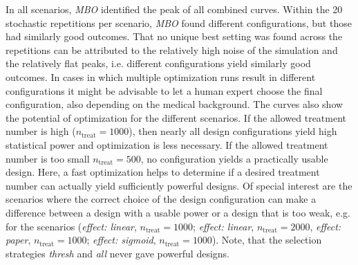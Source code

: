 \documentclass[bimj,fleqn]{w-art}
\theoremstyle{plain}
\theoremstyle{definition}
\begin{document}
In all scenarios, \emph{MBO} identified the peak of all combined curves.
Within the 20 stochastic repetitions per scenario, \emph{MBO} found different configurations, but those had similarly good outcomes.
That no unique best setting was found across the repetitions can be attributed to the relatively high noise of the simulation and the relatively flat peaks, i.e. different configurations yield similarly good outcomes.
In cases in which multiple optimization runs result in different configurations it might be advisable to let a human expert choose the final configuration, also depending on the medical background.
The curves also show the potential of optimization for the different scenarios.
If the allowed treatment number is high ($n_{\text{treat}} = 1000$), then nearly all design configurations yield high statistical power and optimization is less necessary.
If the allowed treatment number is too small $n_{\text{treat}} = 500$, no configuration yields a practically usable design.
Here, a fast optimization helps to determine if a desired treatment number can actually yield sufficiently powerful designs.
Of special interest are the scenarios where the correct choice of the design configuration can make a difference between a design with a usable power or a design that is too weak, e.g. for the scenarios (\emph{effect: linear}, $n_{\text{treat}} = 1000$; \emph{effect: linear}, $n_{\text{treat}} = 2000$, \emph{effect: paper}, $n_{\text{treat}} = 1000$; \emph{effect: sigmoid}, $n_{\text{treat}} = 1000$).
Note, that the selection strategies \emph{thresh} and \emph{all} never gave powerful designs.


\end{document}
